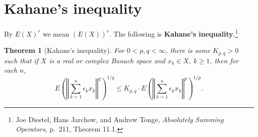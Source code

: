 \documentclass{article}
\newcommand{\norm}[1]{\left\Vert #1 \right\Vert}
\newtheorem{theorem}{Theorem}
\theoremstyle{definition}
\begin{document}
\section{Kahane's inequality}
By $E(X)^r$ we mean $(E(X))^r$. 
The following is \textbf{Kahane's inequality}.\footnote{Joe Diestel, Hans Jarchow, and Andrew Tonge, {\em Absolutely Summing Operators},
p.~211, Theorem 11.1.}

\begin{theorem}[Kahane's inequality]
For   $0<p,q<\infty$, there is some $K_{p,q}>0$ such that if $X$ is a real or complex Banach
space and $x_k \in X$, $k \geq 1$, then for each $n$,
\[
E\left(\norm{\sum_{k=1}^n \epsilon_k x_k}^q\right)^{1/q}
\leq K_{p,q}   \cdot E\left(\norm{\sum_{k=1}^n \epsilon_k x_k}^p\right)^{1/p}.
\]
\end{theorem}
\end{document}

